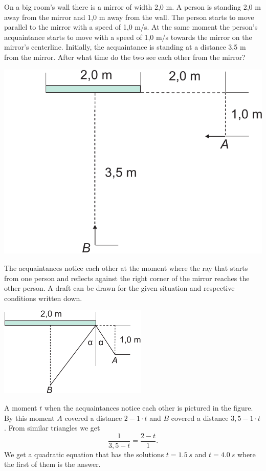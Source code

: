 On a big room’s wall there is a mirror of width 2,0 m. A person is standing 2,0 m away from the mirror and 1,0 m away from the wall. The person starts to move parallel to the mirror with a speed of 1,0 m/s. At the same moment the person’s acquaintance starts to move with a speed of 1,0 m/s towards the mirror on the mirror’s centerline. Initially, the acquaintance is standing at a distance 3,5 m from the mirror. After what time do the two see each other from the mirror?
\begin{center}
\includegraphics[width=0.5\linewidth]{2012-v2g-01-peegel2}%
\end{center}

\hinteng
The acquaintances notice each other at the moment where the ray that starts from one person and reflects against the right corner of the mirror reaches the other person. A draft can be drawn for the given situation and respective conditions written down.

\solueng
\begin{center}
\includegraphics[width=200pt]{2012-v2g-01-peegel_lah}
\end{center}
A moment $t$ when the acquaintances notice each other is pictured in the figure. By this moment $A$ covered a distance $2-1\cdot t$ and $B$ covered a distance $3,5-1\cdot t$. From similar triangles we get
\[
\frac{1}{3,5-t}=\frac{2-t}{1}.
\] 
We get a quadratic equation that has the solutions $t=\SI{1,5}{s}$ and $t=\SI{4,0}{s}$ where the first of them is the answer.
\probend